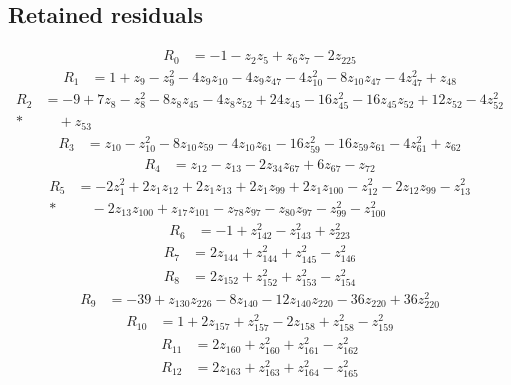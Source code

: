 \subsection*{Retained residuals}
\begin{align*}
R_{0}&=-1-z_{2} z_{5}+z_{6} z_{7}-2z_{225}
\end{align*}
\begin{align*}
R_{1}&=1+z_{9}-z_{9}^{2}-4z_{9} z_{10}-4z_{9} z_{47}-4z_{10}^{2}-8z_{10} z_{47}-4z_{47}^{2}+z_{48}
\end{align*}
\begin{align*}
R_{2}&=-9+7z_{8}-z_{8}^{2}-8z_{8} z_{45}-4z_{8} z_{52}+24z_{45}-16z_{45}^{2}-16z_{45} z_{52}+12z_{52}-4z_{52}^{2}\\*
&\quad{}+z_{53}
\end{align*}
\begin{align*}
R_{3}&=z_{10}-z_{10}^{2}-8z_{10} z_{59}-4z_{10} z_{61}-16z_{59}^{2}-16z_{59} z_{61}-4z_{61}^{2}+z_{62}
\end{align*}
\begin{align*}
R_{4}&=z_{12}-z_{13}-2z_{34} z_{67}+6z_{67}-z_{72}
\end{align*}
\begin{align*}
R_{5}&=-2z_{1}^{2}+2z_{1} z_{12}+2z_{1} z_{13}+2z_{1} z_{99}+2z_{1} z_{100}-z_{12}^{2}-2z_{12} z_{99}-z_{13}^{2}\\*
&\quad{}-2z_{13} z_{100}+z_{17} z_{101}-z_{78} z_{97}-z_{80} z_{97}-z_{99}^{2}-z_{100}^{2}
\end{align*}
\begin{align*}
R_{6}&=-1+z_{142}^{2}-z_{143}^{2}+z_{223}^{2}
\end{align*}
\begin{align*}
R_{7}&=2z_{144}+z_{144}^{2}+z_{145}^{2}-z_{146}^{2}
\end{align*}
\begin{align*}
R_{8}&=2z_{152}+z_{152}^{2}+z_{153}^{2}-z_{154}^{2}
\end{align*}
\begin{align*}
R_{9}&=-39+z_{130} z_{226}-8z_{140}-12z_{140} z_{220}-36z_{220}+36z_{220}^{2}
\end{align*}
\begin{align*}
R_{10}&=1+2z_{157}+z_{157}^{2}-2z_{158}+z_{158}^{2}-z_{159}^{2}
\end{align*}
\begin{align*}
R_{11}&=2z_{160}+z_{160}^{2}+z_{161}^{2}-z_{162}^{2}
\end{align*}
\begin{align*}
R_{12}&=2z_{163}+z_{163}^{2}+z_{164}^{2}-z_{165}^{2}
\end{align*}
